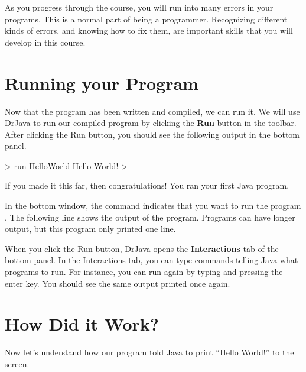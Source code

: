 
As you progress through the course, you will run into many errors in your programs. This is a normal part of being a programmer. Recognizing different kinds of errors, and knowing how to fix them, are important skills that you will develop in this course.

\section{Running your Program}

Now that the program has been written and compiled, we can run it. We will use DrJava to run our compiled program by clicking the \textbf{Run} button in the toolbar. After clicking the Run button, you should see the following output in the bottom panel.
\begin{code}
> run HelloWorld 
Hello World!
>
\end{code}

If you made it this far, then congratulations! You ran your first Java program.

In the bottom window, the  command indicates that you want to run the program . The following line shows the output of the program. Programs can have longer output, but this program only printed one line.

When you click the Run button, DrJava opens the \textbf{Interactions} tab of the bottom panel. In the Interactions tab, you can type commands telling Java what programs to run. For instance, you can run  again by typing  and pressing the enter key. You should see the same output printed once again.

\section{How Did it Work?} 

Now let's understand how our  program told Java to print ``Hello World!'' to the screen.

